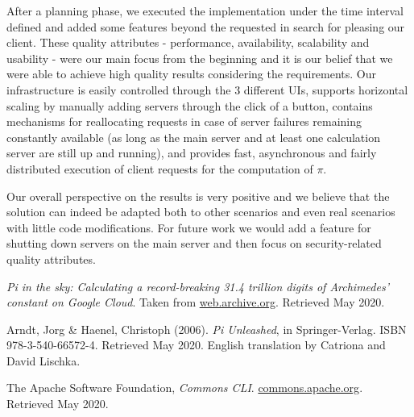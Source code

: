 \documentclass[12pt]{article}
\begin{document}
After a planning phase, we executed the implementation under the time interval defined and added some features beyond the requested in search for pleasing our client.
These quality attributes - performance, availability, scalability and usability - were our main focus from the beginning and it is our belief that we were able
to achieve high quality results considering the requirements.
Our infrastructure is easily controlled through the 3 different UIs, supports horizontal scaling by manually adding servers through the click of a button,
contains mechanisms for reallocating requests in case of server failures remaining constantly available (as long as the main server and at least one calculation
server are still up and running), and provides fast, asynchronous and fairly distributed execution of client requests for the computation of $\pi$.

Our overall perspective on the results is very positive and we believe that the solution can indeed be adapted both to other scenarios and even real scenarios
with little code modifications.
For future work we would add a feature for shutting down servers on the main server and then focus on security-related quality attributes.

\begin{thebibliography}{9} %
  

  \textit{Pi in the sky: Calculating a record-breaking 31.4 trillion digits of Archimedes' constant on Google Cloud}.
  Taken from \href{https://web.archive.org/web/20191019023120/https://cloud.google.com/blog/products/compute/calculating-31-4-trillion-digits-of-archimedes-constant-on-google-cloud}{web.archive.org}.
  Retrieved May 2020.

  Arndt, Jorg \& Haenel, Christoph (2006).
  \textit{Pi Unleashed}, in Springer-Verlag.
  ISBN 978-3-540-66572-4.
  Retrieved May 2020.
  English translation by Catriona and David Lischka.

  The Apache Software Foundation,
  \textit{Commons CLI}.
  \href{https://commons.apache.org/proper/commons-cli/}{commons.apache.org}.
  Retrieved May 2020.


\end{thebibliography}

\clearpage
\end{document}
